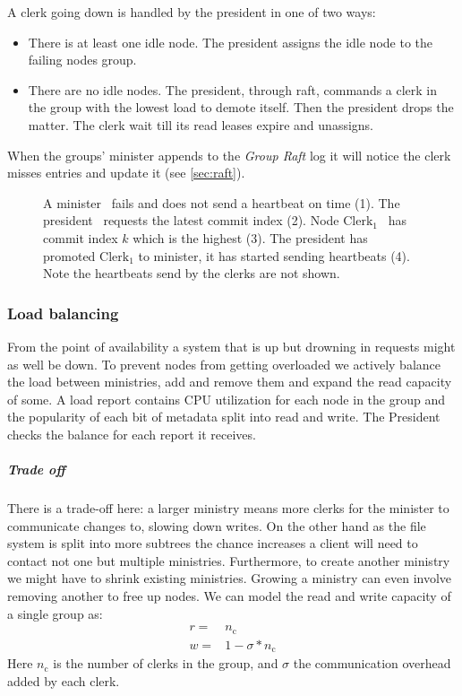 A clerk going down is handled by the president in one of two ways:
\begin{itemize}
	\item There is at least one idle node. The president assigns the idle node to the failing nodes group. 
	\item There are no idle nodes. The president, through raft, commands a clerk in the group with the lowest load to demote itself. Then the president drops the matter. The clerk wait till its read leases expire and unassigns.
\end{itemize}
%
When the groups' minister appends to the \textit{Group Raft} log it will notice the clerk misses entries and update it (see \cref{sec:raft}).

\begin{figure}[htbp]
	\centering
	
	\caption{A minister~\amdsLeg{} fails and does not send a heartbeat on time (1). The president~\presidentLeg{} requests the latest commit index (2). Node $\text{Clerk}_1$~\cmdsLeg{} has commit index $k$ which is the highest (3). The president has promoted $\text{Clerk}_1$ to minister, it has started sending heartbeats (4). Note the heartbeats send by the clerks are not shown.}
	\label{fig:appoint}
\end{figure}
%
\subsubsection*{Load balancing} \label{sec:loadb}
From the point of availability a system that is up but drowning in requests might as well be down. To prevent nodes from getting overloaded we actively balance the load between ministries, add and remove them and expand the read capacity of some. A load report contains CPU utilization for each node in the group and the popularity of each bit of metadata split into read and write. The President checks the balance for each report it receives.
%
\subparagraph*{Trade off} \label{sec:tradeoff}
There is a trade-off here: a larger ministry means more clerks for the minister to communicate changes to, slowing down writes. On the other hand as the file system is split into more subtrees the chance increases a client will need to contact not one but multiple ministries. Furthermore, to create another ministry we might have to shrink existing ministries. Growing a ministry can even involve removing another to free up nodes. 
%
We can model the read and write capacity of a single group as:
\begin{align}
	r =& n_\text{c} \\
	w =& 1 - \sigma*n_\text{c}
\end{align}%
Here $n_\text{c}$ is the number of clerks in the group, and $\sigma$ the communication overhead added by each clerk. 


